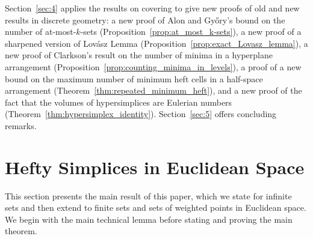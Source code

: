 \documentclass[10pt,a4paper]{article}
\theoremstyle{plain}
\begin{document}
%
Section~\ref{sec:4} applies the results on covering to give new proofs of old and new results in discrete geometry: a new proof of Alon and Gy\H{o}ry's bound on the number of at-most-$k$-sets (Proposition~\ref{prop:at_most_k-sets}), a new proof of a sharpened version of Lov\'{a}sz Lemma (Proposition~\ref{prop:exact_Lovasz_lemma}), a new proof of Clarkson's result on the number of minima in a hyperplane arrangement (Proposition~\ref{prop:counting_minima_in_levels}), a proof of a new bound on the maximum number of minimum heft cells in a half-space arrangement (Theorem~\ref{thm:repeated_minimum_heft}), and a new proof of the fact that the volumes of hypersimplices are Eulerian numbers (Theorem~\ref{thm:hypersimplex_identity}).
Section~\ref{sec:5} offers concluding remarks.
\section{Hefty Simplices in Euclidean Space}
\label{sec:2}
This section presents the main result of this paper, which we state for infinite sets and then extend to finite sets and sets of weighted points in Euclidean space.
We begin with the main technical lemma before stating and proving the main theorem.
\end{document}
